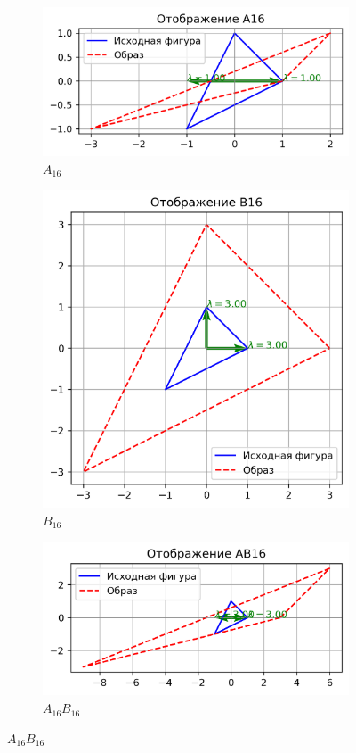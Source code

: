 \begin{figure}[H]
  \centering
  \begin{subfigure}[b]{0.3\textwidth}
    \includegraphics[width=\linewidth]{plots/A16.png}
    \caption{$A_{16}$}
  \end{subfigure}\hfill
  \begin{subfigure}[b]{0.3\textwidth}
    \includegraphics[width=\linewidth]{plots/B16.png}
    \caption{$B_{16}$}
  \end{subfigure}\hfill
  \begin{subfigure}[b]{0.3\textwidth}
    \includegraphics[width=\linewidth]{plots/AB16.png}
    \caption{$A_{16}B_{16}$}
  \end{subfigure}


\end{figure}
